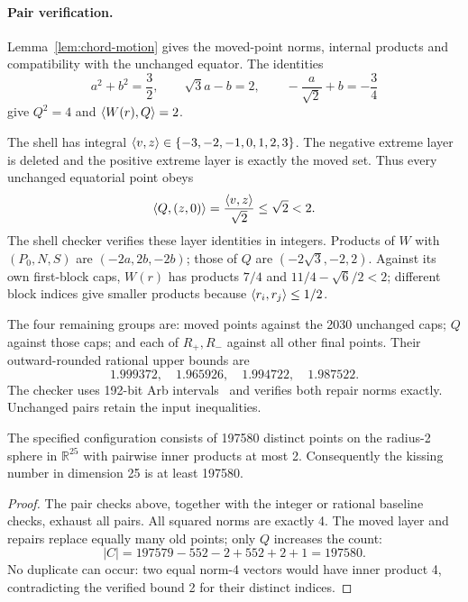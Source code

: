 \paragraph{Pair verification.}
Lemma~\ref{lem:chord-motion} gives the moved-point norms, internal products
and compatibility with the unchanged equator. The identities
\[
a^2+b^2=\frac32,\qquad \sqrt3a-b=2,\qquad
-\frac a{\sqrt2}+b=-\frac34
\]
give $Q^2=4$ and $\langle W(r),Q\rangle=2$.

The shell has integral $\langle v,z\rangle\in\{-3,-2,-1,0,1,2,3\}$.
The negative extreme layer is deleted and the positive extreme layer
is exactly the moved set. Thus every unchanged equatorial point obeys
\[
 \langle Q,(z,0)\rangle=\frac{\langle v,z\rangle}{\sqrt2}\le\sqrt2<2.
\]
The shell checker verifies these layer identities in integers.
Products of $W$ with $(P_0,N,S)$ are $(-2a,2b,-2b)$; those of $Q$
are $(-2\sqrt3,-2,2)$. Against its own first-block caps, $W(r)$ has
products $7/4$ and $11/4-\sqrt6/2<2$; different block indices give
smaller products because $\langle r_i,r_j\rangle\le1/2$.

The four remaining groups are: moved points against the 2030 unchanged
caps; $Q$ against those caps; and each of $R_+,R_-$ against all other
final points. Their outward-rounded rational upper bounds are
\[
1.999372,\quad 1.965926,\quad 1.994722,\quad 1.987522.
\]
The checker uses 192-bit Arb intervals~\cite{johansson-arb} and verifies
both repair norms exactly. Unchanged pairs retain the input inequalities.

\begin{theorem}\label{thm:d25}
The specified configuration consists of 197580 distinct points on
the radius-2 sphere in $\mathbb R^{25}$ with pairwise inner products at
most 2. Consequently the kissing number in dimension 25 is at least 197580.
\end{theorem}

\begin{proof}
The pair checks above, together with the integer or rational baseline
checks, exhaust all pairs. All squared norms are exactly 4. The moved
layer and repairs replace equally many old points; only $Q$ increases
the count:
\[
 |C|=197579-552-2+552+2+1=197580.
\]
No duplicate can occur: two equal norm-4 vectors would have inner product
4, contradicting the verified bound 2 for their distinct indices.
\end{proof}
